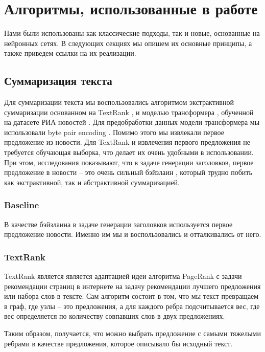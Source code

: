 \documentclass[14pt]{matmex-diploma-custom}
\begin{document}
\section{Алгоритмы, использованные в работе}
Нами были использованы как классические подходы, так и новые, основанные на нейронных сетях.
В следующих секциях мы опишем их основные принципы, а также приведем ссылки на их реализации.

\subsection{Суммаризация текста}
Для суммаризации текста мы воспользовались алгоритмом экстрактивной суммаризации
основанном на TextRank \cite{DBLP:journals/corr/BarriosLAW16, rehurek_lrec, TextrankOriginal},
и моделью трансформера \cite{DBLP:journals/corr/VaswaniSPUJGKP17}, обученной на
датасете РИА новостей \cite{gavrilov2018self}.
Для предобработки данных модели трансформера мы использовали byte
pair encoding \cite{DBLP:journals/corr/SennrichHB15}.
Помимо этого мы извлекали первое предложение из новости.
Для TextRank и извлечения первого предложения не требуется обучающая выборка, что
делает их очень удобными в использовании. При этом, исследования показывают, что
в задаче генерации заголовков, первое предложение в новости --
это очень сильный бэйзлаин \cite{gavrilov2018self},
который трудно побить как экстрактивной, так и абстрактивной суммаризацией.

\subsubsection{Baseline}

В качестве бэйзлаина в задаче генерации заголовков используется первое предложение новости. Именно им мы и воспользовались и отталкивались от него.


\subsubsection{TextRank}

TextRank является является адаптацией идеи алгоритма PageRank \cite{Page98thepagerank} с задачи рекомендации страниц в интернете на задачу рекомендации лучшего предложения или набора слов в тексте. Сам алгоритм состоит в том, что мы текст превращаем в граф, где узлы -- это предложения, а для каждого ребра подсчитывается вес, где вес определяется по количеству совпавших слов в двух предложениях.

Таким образом, получается, что можно выбрать предложение с самыми тяжелыми ребрами в качестве предложения, которое описывало бы исходный текст.
\end{document}
